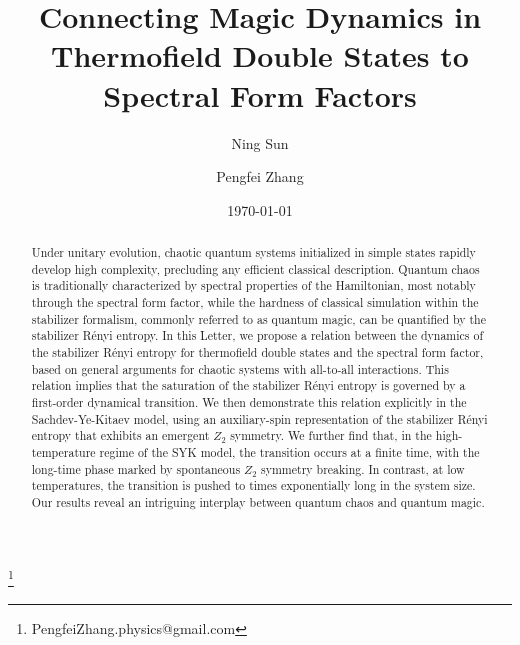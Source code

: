 \documentclass[aps,prl,twocolumn,superscriptaddress,longbibliography]{revtex4-2}
\begin{document}
  \title{Connecting Magic Dynamics in Thermofield Double States to Spectral Form Factors }


  \author{Ning Sun}

  \author{Pengfei Zhang}
  \thanks{PengfeiZhang.physics@gmail.com}

  \date{\today}

  \begin{abstract}
  Under unitary evolution, chaotic quantum systems initialized in simple states rapidly develop high complexity, precluding any efficient classical description. Quantum chaos is traditionally characterized by spectral properties of the Hamiltonian, most notably through the spectral form factor, while the hardness of classical simulation within the stabilizer formalism, commonly referred to as quantum magic, can be quantified by the stabilizer R\'enyi entropy. In this Letter, we propose a relation between the dynamics of the stabilizer R\'enyi entropy for thermofield double states and the spectral form factor, based on general arguments for chaotic systems with all-to-all interactions. This relation implies that the saturation of the stabilizer R\'enyi entropy is governed by a first-order dynamical transition. We then demonstrate this relation explicitly in the Sachdev-Ye-Kitaev model, using an auxiliary-spin representation of the stabilizer R\'enyi entropy that exhibits an emergent $Z_2$ symmetry. We further find that, in the high-temperature regime of the SYK model, the transition occurs at a finite time, with the long-time phase marked by spontaneous $Z_2$ symmetry breaking. In contrast, at low temperatures, the transition is pushed to times exponentially long in the system size. Our results reveal an intriguing interplay between quantum chaos and quantum magic.
  \end{abstract}

  \maketitle
\end{document}
